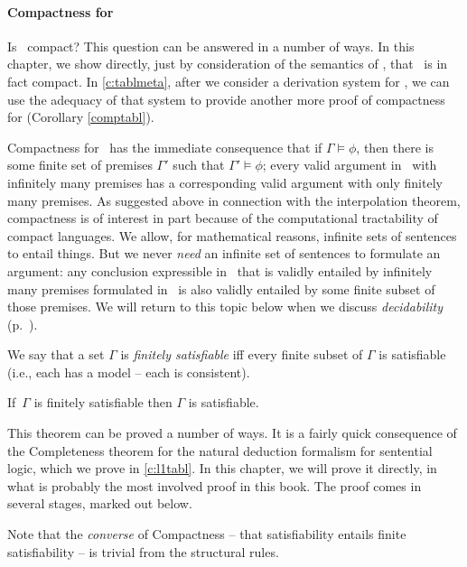 \paragraph{Compactness for \lone} Is \lone\ compact? This question can be answered in a number of ways. In this chapter, we show directly, just by consideration of the semantics of \lone, that \lone\ is in fact compact. In \autoref{c:tablmeta}, after we consider a derivation system for \lone, we can use the adequacy of that system to provide another more proof of compactness for \lone (Corollary \ref{comptabl}).

Compactness for \lone\ has the immediate consequence that if $\Gamma\vDash\phi$, then there is some finite set of premises $\Gamma'$ such that $\Gamma'\vDash\phi$; every valid argument in \lone\ with infinitely many premises has a corresponding valid argument with only finitely many premises. As suggested above in connection with the interpolation theorem, compactness is of interest in part because of the computational tractability of compact languages. We allow, for mathematical reasons, infinite sets of sentences to entail things. But we never \emph{need} an infinite set of sentences to formulate an argument: any conclusion expressible in \lone\ that is validly entailed by infinitely many premises formulated in \lone\ is also validly entailed by some finite subset of those premises. We will return to this topic below when we discuss \emph{decidability} (p.\ \pageref{decide}).

\begin{definition}
	We say that a set $\Gamma$ is \emph{finitely satisfiable} iff every finite subset of $\Gamma$ is satisfiable (i.e., each has a model – each is consistent).
\end{definition}
\begin{theorem}[Compactness]\label{compact}
If\, $\Gamma$ is finitely satisfiable then $\Gamma$ is satisfiable. 
\end{theorem}

This theorem can be proved a number of ways. It is a fairly quick consequence of the Completeness theorem for the natural deduction formalism for sentential logic, which we prove in \autoref{c:l1tabl}. In this chapter, we will prove it directly, in what is probably the most involved proof in this book. The proof comes in several stages, marked out below.

Note that the \emph{converse} of Compactness – that satisfiability entails finite satisfiability – is trivial from the structural rules.

